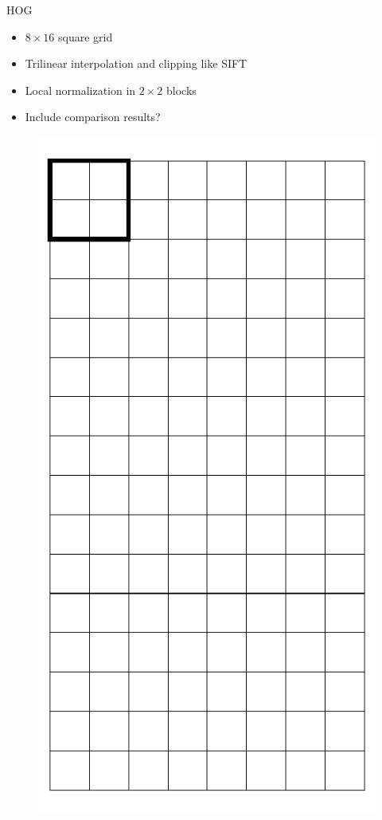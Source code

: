 \documentclass[14pt,t]{beamer}
\begin{document}
\begin{frame}{HOG \cite{dalal2005histograms}}
\begin{minipage}[t]{0.7\textwidth}
	\begin{itemize}
	\item $8 \times 16$ square grid
	\item Trilinear interpolation and clipping like SIFT
	\item Local normalization in $2 \times 2$ blocks
	\item Include comparison results?
	\end{itemize}
\end{minipage}
\begin{minipage}[t]{0.25\textwidth}
	\begin{figure}
		\includegraphics[width=\textwidth]{img/hogGrid.pdf}
	\end{figure}
\end{minipage}
\end{frame}
\end{document}
